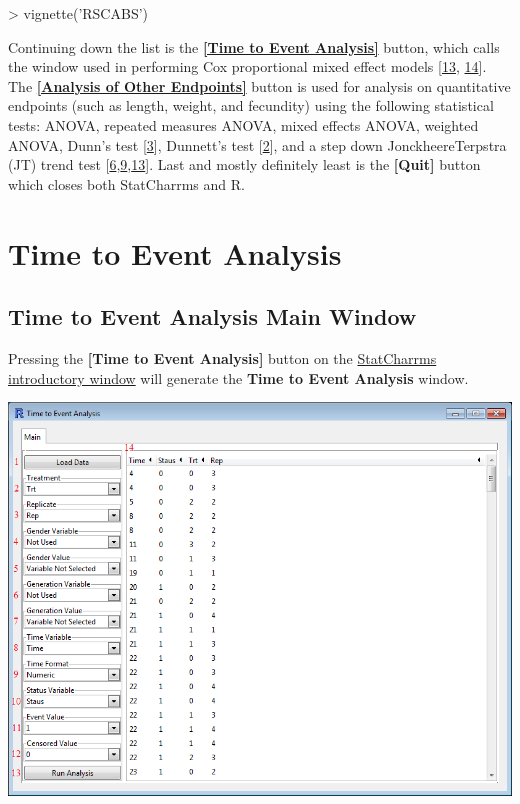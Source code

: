\documentclass[a4paper]{article}
\begin{document}
\begin{RBox}
> vignette('RSCABS')	
\end{RBox}
	    
Continuing down the list is the \hyperlink{Time2Event}{\textbf{[Time to Event Analysis]}} button, which calls the
window used in performing Cox proportional mixed effect models [\hyperlink{R13}{13}, \hyperlink{R14}{14}].  
The \hyperlink{OtherEnd}{\textbf{[Analysis of Other Endpoints]}} 
button is used for analysis on quantitative endpoints (such as length, weight, and fecundity) using the following statistical tests:   
ANOVA, repeated measures ANOVA, mixed effects ANOVA, weighted ANOVA, Dunn's test [\hyperlink{R3}{3}], Dunnett's test [\hyperlink{R2}{2}], 
and a step down Jonckheere\textendash{}Terpstra (JT) trend test 
[\hyperlink{R6}{6},\hyperlink{R9}{9},\hyperlink{R13}{13}].                    
Last and mostly definitely least is the \textbf{[Quit]} button which closes both StatCharrms and R.   

\hypertarget{Time2Event}{\section*{Time to Event Analysis}}

\label{sec:Time2Event}
\subsection*{Time to Event Analysis Main Window}
\label{subsec:Time2EventMain}


	Pressing the \textbf{[Time to Event Analysis]} button on the  \hyperlink{fig:IntroWindow}{StatCharrms introductory window} 
	will generate the \textbf{Time to Event Analysis} window. 
	

\begin{center}
\hypertarget{fig:Time2Event2}{\includegraphics[width=\textwidth,keepaspectratio]{Time2Event2.png}}
\end{center} 
\end{document}
